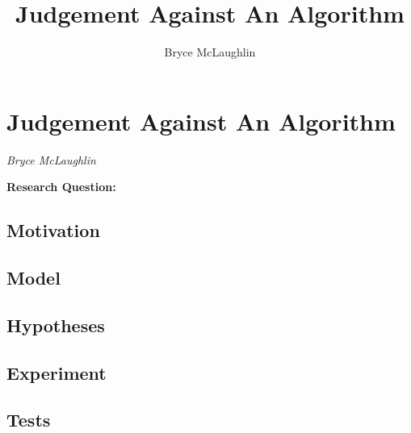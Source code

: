 \documentclass[10pt]{article}
\title{Judgement Against An Algorithm}
\author{Bryce McLaughlin}
\begin{document}
\section*{Judgement Against An Algorithm}

\textit{Bryce McLaughlin}

\medskip

\textbf{Research Question:} 

\subsection*{Motivation}

\subsection*{Model}


\subsection*{Hypotheses}


\subsection*{Experiment}


\subsection*{Tests}
\end{document}
